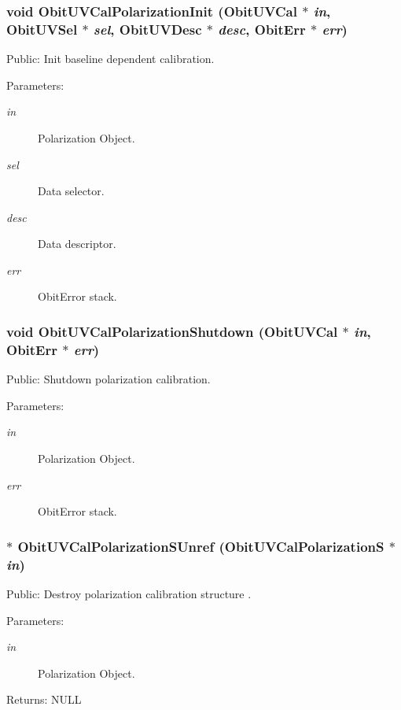\subsubsection{\setlength{\rightskip}{0pt plus 5cm}void Obit\-UVCal\-Polarization\-Init ({\bf Obit\-UVCal} $\ast$ {\em in}, {\bf Obit\-UVSel} $\ast$ {\em sel}, {\bf Obit\-UVDesc} $\ast$ {\em desc}, {\bf Obit\-Err} $\ast$ {\em err})}\label{ObitUVCalPolarization_8h_a0}


Public: Init baseline dependent calibration. 

\begin{Desc}
\item[Parameters:]
\begin{description}
\item[{\em in}]Polarization Object. \item[{\em sel}]Data selector. \item[{\em desc}]Data descriptor. \item[{\em err}]Obit\-Error stack. \end{description}
\end{Desc}
\subsubsection{\setlength{\rightskip}{0pt plus 5cm}void Obit\-UVCal\-Polarization\-Shutdown ({\bf Obit\-UVCal} $\ast$ {\em in}, {\bf Obit\-Err} $\ast$ {\em err})}\label{ObitUVCalPolarization_8h_a2}


Public: Shutdown polarization calibration. 

\begin{Desc}
\item[Parameters:]
\begin{description}
\item[{\em in}]Polarization Object. \item[{\em err}]Obit\-Error stack. \end{description}
\end{Desc}
\subsubsection{$\ast$ Obit\-UVCal\-Polarization\-SUnref ({\bf Obit\-UVCal\-Polarization\-S} $\ast$ {\em in})}\label{ObitUVCalPolarization_8h_a3}


Public: Destroy polarization calibration structure . 

\begin{Desc}
\item[Parameters:]
\begin{description}
\item[{\em in}]Polarization Object. \end{description}
\end{Desc}
\begin{Desc}
\item[Returns:]NULL \end{Desc}

